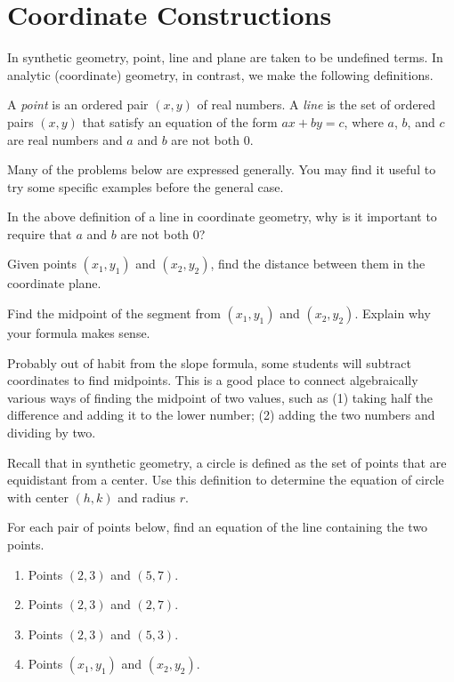 \newpage
\section{Coordinate Constructions}
In synthetic geometry, point, line and plane are taken to be undefined terms.  In analytic (coordinate) geometry, in contrast, we make the following definitions.  
\begin{definition}
A \emph{point} is an ordered pair $(x,y)$ of real numbers. A \emph{line} is the set of ordered pairs $(x,y)$ that satisfy an equation of the form $ax + by = c$, where $a$, $b$, and $c$ are real numbers and $a$ and $b$ are not both 0.   
\end{definition}

Many of the problems below are expressed generally.  You may find it useful to try some specific examples before the general case.  

\begin{prob}
In the above definition of a line in coordinate geometry, why is it important to require that $a$ and $b$ are not both 0?  
\end{prob}

\begin{prob}
Given points $(x_1, y_1)$ and $(x_2, y_2)$, find the distance between them in the coordinate plane.
\end{prob}

\begin{prob}
Find the midpoint of the segment from $(x_1, y_1)$ and $(x_2, y_2)$.  Explain why your formula makes sense. 
\end{prob}

\begin{teachingnote}
Probably out of habit from the slope formula, some students will subtract coordinates to find midpoints.  This is a good place to connect algebraically various ways of finding the midpoint of two values, such as (1) taking half the difference and adding it to the lower number; (2) adding the two numbers and dividing by two. 
\end{teachingnote}   

\begin{prob}
Recall that in synthetic geometry, a circle is defined as the set of points that are equidistant from a center.  Use this definition to determine the equation of circle with center $(h, k)$ and radius $r$.  
\end{prob}

\begin{prob}
For each pair of points below, find an equation of the line containing the two points.  
\begin{enumerate}
\item Points $(2,3)$ and $(5,7)$.  
\item Points $(2,3)$ and $(2,7)$.  
\item Points $(2,3)$ and $(5,3)$. 
\item Points $(x_1, y_1)$ and $(x_2, y_2)$.  
\end{enumerate}
\end{prob}

